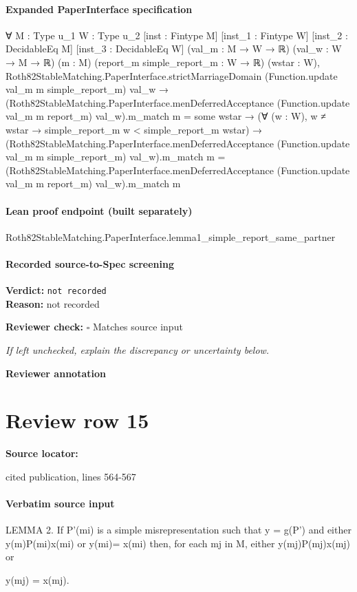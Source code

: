 \documentclass[10pt]{article}
\newcommand{\reviewerbox}{%
  \par\noindent\fbox{\parbox{0.96\linewidth}{\rule{0pt}{0.38in}}}\par
}
\newcommand{\reviewmatch}[1]{%
  \par\noindent\textbf{Reviewer check:} $\square$\; #1\par
  \noindent\emph{If left unchecked, explain the discrepancy or uncertainty below.}\par
}
\begin{document}
\paragraph{Expanded PaperInterface specification}
\begin{ReviewVerbatim}
∀ {M : Type u_1} {W : Type u_2} [inst : Fintype M] [inst_1 : Fintype W] [inst_2 : DecidableEq M]
  [inst_3 : DecidableEq W] (val_m : M → W → ℝ) (val_w : W → M → ℝ) (m : M) (report_m simple_report_m : W → ℝ)
  (wstar : W),
  Roth82StableMatching.PaperInterface.strictMarriageDomain (Function.update val_m m simple_report_m) val_w →
    (Roth82StableMatching.PaperInterface.menDeferredAcceptance (Function.update val_m m report_m) val_w).m_match m =
        some wstar →
      (∀ (w : W), w ≠ wstar → simple_report_m w < simple_report_m wstar) →
        (Roth82StableMatching.PaperInterface.menDeferredAcceptance (Function.update val_m m simple_report_m)
                val_w).m_match
            m =
          (Roth82StableMatching.PaperInterface.menDeferredAcceptance (Function.update val_m m report_m) val_w).m_match m
\end{ReviewVerbatim}

\paragraph{Lean proof endpoint (built separately)}\begin{ReviewVerbatim}
Roth82StableMatching.PaperInterface.lemma1_simple_report_same_partner
\end{ReviewVerbatim}

\paragraph{Recorded source-to-Spec screening}
\textbf{Verdict:} \texttt{not recorded}
\\
\textbf{Reason:} not recorded
\reviewmatch{Matches source input}
\noindent\textbf{Reviewer annotation}\par
\reviewerbox
\clearpage
\hypertarget{source-claim-46db9470e122c4fe}{}
\section*{Review row 15}
\textbf{Source locator:} {\footnotesize\raggedright cited publication, lines 564-\allowbreak{}567\par}
\paragraph{Verbatim source input}
\begin{ReviewVerbatim}
LEMMA 2. If P'(mi) is a simple misrepresentation such that y = g(P') and either
y(m)P(mi)x(mi) or y(mi)= x(mi) then, for each mj in M, either y(mj)P(mj)x(mj) or

y(mj) = x(mj).
\end{ReviewVerbatim}
\end{document}
